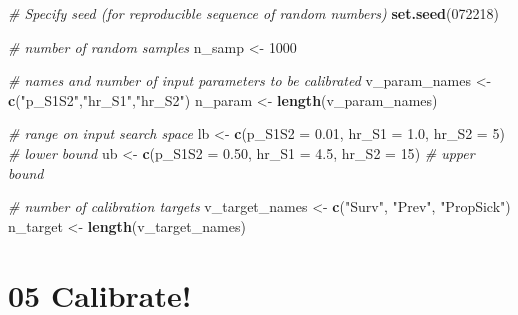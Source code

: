 \documentclass[
]{article}
\newenvironment{Shaded}{\begin{snugshade}}{\end{snugshade}}
\newcommand{\CommentTok}[1]{\textcolor[rgb]{0.56,0.35,0.01}{\textit{#1}}}
\newcommand{\DataTypeTok}[1]{\textcolor[rgb]{0.13,0.29,0.53}{#1}}
\newcommand{\DecValTok}[1]{\textcolor[rgb]{0.00,0.00,0.81}{#1}}
\newcommand{\FloatTok}[1]{\textcolor[rgb]{0.00,0.00,0.81}{#1}}
\newcommand{\KeywordTok}[1]{\textcolor[rgb]{0.13,0.29,0.53}{\textbf{#1}}}
\newcommand{\NormalTok}[1]{#1}
\newcommand{\StringTok}[1]{\textcolor[rgb]{0.31,0.60,0.02}{#1}}
\begin{document}
\begin{Shaded}
\begin{Highlighting}[]
\CommentTok{# Specify seed (for reproducible sequence of random numbers)}
\KeywordTok{set.seed}\NormalTok{(}\DecValTok{072218}\NormalTok{)}

\CommentTok{# number of random samples}
\NormalTok{n_samp <-}\StringTok{ }\DecValTok{1000}

\CommentTok{# names and number of input parameters to be calibrated}
\NormalTok{v_param_names <-}\StringTok{ }\KeywordTok{c}\NormalTok{(}\StringTok{"p_S1S2"}\NormalTok{,}\StringTok{"hr_S1"}\NormalTok{,}\StringTok{"hr_S2"}\NormalTok{)}
\NormalTok{n_param <-}\StringTok{ }\KeywordTok{length}\NormalTok{(v_param_names)}

\CommentTok{# range on input search space}
\NormalTok{lb <-}\StringTok{ }\KeywordTok{c}\NormalTok{(}\DataTypeTok{p_S1S2 =} \FloatTok{0.01}\NormalTok{, }\DataTypeTok{hr_S1 =} \FloatTok{1.0}\NormalTok{, }\DataTypeTok{hr_S2 =} \DecValTok{5}\NormalTok{) }\CommentTok{# lower bound}
\NormalTok{ub <-}\StringTok{ }\KeywordTok{c}\NormalTok{(}\DataTypeTok{p_S1S2 =} \FloatTok{0.50}\NormalTok{, }\DataTypeTok{hr_S1 =} \FloatTok{4.5}\NormalTok{, }\DataTypeTok{hr_S2 =} \DecValTok{15}\NormalTok{) }\CommentTok{# upper bound}

\CommentTok{# number of calibration targets}
\NormalTok{v_target_names <-}\StringTok{ }\KeywordTok{c}\NormalTok{(}\StringTok{"Surv"}\NormalTok{, }\StringTok{"Prev"}\NormalTok{, }\StringTok{"PropSick"}\NormalTok{)}
\NormalTok{n_target <-}\StringTok{ }\KeywordTok{length}\NormalTok{(v_target_names)}
\end{Highlighting}
\end{Shaded}

\hypertarget{calibrate}{%
\section{05 Calibrate!}\label{calibrate}}
\end{document}
